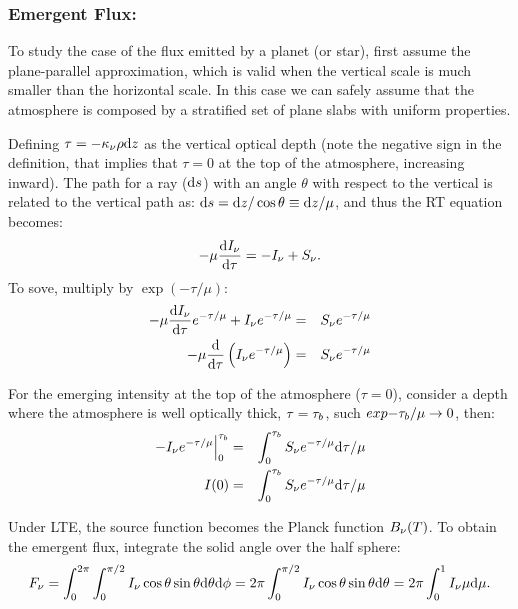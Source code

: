 \documentclass[letterpaper,12pt]{article}
\begin{document}
\subsubsection{Emergent Flux:} 

To study the case of the flux emitted by a planet (or star), first
assume the plane-parallel approximation, which is valid when the
vertical scale is much smaller than the horizontal scale.  In this
case we can safely assume that the atmosphere is composed by a
stratified set of plane slabs with uniform properties.

Defining $\tau = -\kappa\sb{\nu} \rho \der z$ as the vertical optical
depth (note the negative sign in the definition, that implies that
$\tau=0$ at the top of the atmosphere, increasing inward).  The path
for a ray (${\rm d} s$) with an angle $\theta$ with respect to the
vertical is related to the vertical path as: ${\rm d} s = {\rm d}
z/\cos\theta \equiv {\rm d} z / \mu$, and thus the RT equation becomes:
\begin{equation}
-\mu\frac{\der I\sb{\nu}}{\der \tau} = - I\sb{\nu}  +  S\sb{\nu}.
\end{equation}
To sove, multiply by $\exp(-\tau/\mu)$:
\begin{eqnarray}
-\mu\frac{\der I\sb{\nu}}{\der \tau}e\sp{-\tau/\mu} + I\sb{\nu}e\sp{-\tau/\mu}  & = & S\sb{\nu}e\sp{-\tau/\mu} \\
-\mu\frac{\der}{\der \tau}\left( I\sb{\nu}e\sp{-\tau/\mu} \right)  & = & S\sb{\nu}e\sp{-\tau/\mu}
\end{eqnarray}

For the emerging intensity at the top of the atmosphere ($\tau=0$),
consider a depth where the atmosphere is well optically thick,
$\tau=\tau\sb{b}$, such $exp{-\tau\sb{b}/\mu} \to 0$, then:
\begin{eqnarray}
\Eval{-I\sb{\nu}e\sp{-\tau/\mu}}{0}{\tau\sb{b}}  & = &
     \int\sb{0}\sp{\tau\sb{b}}S\sb{\nu}e\sp{-\tau/\mu}\der\tau/\mu \\
I(0)  & = &
     \int\sb{0}\sp{\tau\sb{b}}S\sb{\nu}e\sp{-\tau/\mu}\der\tau/\mu
\label{eq:topatmint}
\end{eqnarray}

Under LTE, the source function becomes the Planck function $B\sb{\nu}(T)$.
To obtain the emergent flux, integrate the solid angle over the half sphere:
\begin{equation}
F\sb{\nu} =      \int\sb{0}\sp{2\pi}\int\sb{0}\sp{\pi/2} I\sb{\nu} \cos\theta\sin\theta \der\theta \der\phi 
          = 2\pi \int\sb{0}\sp{\pi/2} I\sb{\nu} \cos\theta\sin\theta \der\theta
          = 2\pi \int\sb{0}\sp{1}     I\sb{\nu} \mu\der\mu.
\end{equation}
\end{document}
